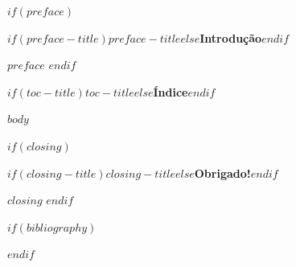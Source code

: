 \documentclass[11pt,a4paper]{article}
\begin{document}
$if(preface)$
\thispagestyle{fancy}
\begin{center}
  {\fontsize{26}{32}\selectfont\bfseries\color{m2tprimary}
   $if(preface-title)$$preface-title$$else$Introdução$endif$}
\end{center}
\vspace{1em}
\setlength{\parindent}{1.5cm}
\setlength{\parskip}{0.5em}
$preface$
\setlength{\parindent}{0pt}
\setlength{\parskip}{0pt}
\clearpage
$endif$

\thispagestyle{empty}
\renewcommand{\contentsname}{}
{
  \begin{center}
    {\fontsize{26}{32}\selectfont\bfseries\color{m2tprimary}
     $if(toc-title)$$toc-title$$else$Índice$endif$}
  \end{center}
  \tableofcontents
}
\clearpage

\setlength{\parindent}{0pt}
\setlength{\parskip}{0.5em}

$body$

$if(closing)$
\clearpage
\thispagestyle{empty}
\begin{center}
  {\fontsize{30}{36}\selectfont\bfseries\color{m2tprimary}
   $if(closing-title)$$closing-title$$else$Obrigado!$endif$}
\end{center}
\vspace{1.5em}
\setlength{\parindent}{1.5cm}
\setlength{\parskip}{0.8em}
$closing$
\setlength{\parindent}{0pt}
\setlength{\parskip}{0pt}
$endif$

$if(bibliography)$


$endif$
\end{document}
